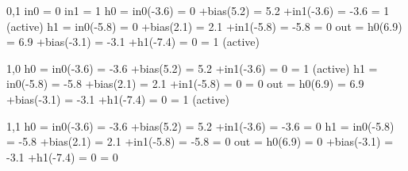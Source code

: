 \documentclass[11pt]{article}
\begin{document}
0,1 \newline
in0 = 0 \newline
in1 = 1 \newline
h0 = in0(-3.6) = 0 \newline
    +bias(5.2) = 5.2 \newline
    +in1(-3.6) = -3.6 \newline
    = 1 (active)\newline
h1 = in0(-5.8) = 0 \newline
    +bias(2.1) = 2.1 \newline
    +in1(-5.8) = -5.8 \newline
    =  0 \newline
out = h0(6.9) = 6.9 \newline
    +bias(-3.1) = -3.1 \newline
    +h1(-7.4) = 0 \newline
    = 1 (active) \newline

1,0 \newline
h0 = in0(-3.6) = -3.6 \newline
    +bias(5.2) = 5.2 \newline
    +in1(-3.6) = 0 \newline
    = 1 (active)\newline
h1 = in0(-5.8) = -5.8 \newline
    +bias(2.1) = 2.1 \newline
    +in1(-5.8) = 0 \newline
    = 0 \newline
out = h0(6.9) = 6.9 \newline
    +bias(-3.1) = -3.1 \newline
    +h1(-7.4) = 0 \newline
    = 1 (active)\newline

1,1 \newline
h0 = in0(-3.6) = -3.6 \newline
    +bias(5.2) = 5.2 \newline
    +in1(-3.6) = -3.6 \newline
    = 0\newline
h1 = in0(-5.8) = -5.8 \newline
    +bias(2.1) = 2.1 \newline
    +in1(-5.8) = -5.8 \newline
    = 0 \newline
out = h0(6.9) = 0 \newline
    +bias(-3.1) = -3.1 \newline
    +h1(-7.4) = 0 \newline
    = 0 \newline
    
\end{document}
